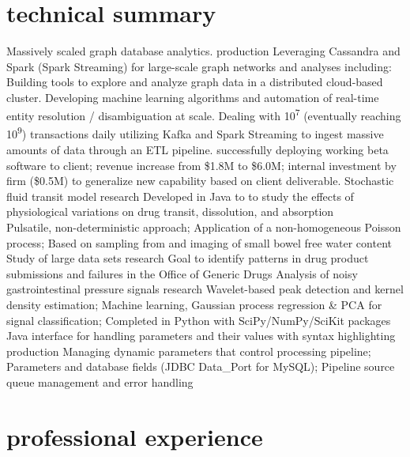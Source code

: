 \documentclass[10pt,twoside]{friggeri-cv}
\begin{document}
\section{technical summary}

\begin{entrylist}
  \entry
    {\scriptsize {}}
    {Massively scaled graph database analytics.}
    {production}
    {\scriptsize Leveraging Cassandra and Spark (Spark Streaming) for large-scale graph networks and analyses including:\\
    Building tools to explore and analyze graph data in a distributed cloud-based cluster.
    Developing machine learning algorithms and automation of real-time entity resolution / disambiguation at scale.
    Dealing with 10\textsuperscript{7} (eventually reaching 10\textsuperscript{9}) transactions daily utilizing Kafka and Spark Streaming to ingest massive amounts of data through an ETL pipeline.
    successfully deploying working beta software to client; revenue increase from \$1.8M to \$6.0M; internal investment by firm (\$0.5M) to generalize new capability based on client deliverable.}
  \entry
    {\scriptsize {}}
    {Stochastic fluid transit model}
    {research}
    {\scriptsize  Developed in Java to to study the effects of physiological variations on drug transit, dissolution, and absorption\\
    Pulsatile, non-deterministic approach; 
    Application of a non-homogeneous Poisson process; 
    Based on sampling from and imaging of small bowel free water content}
  \entry
    {\scriptsize {}}
    {Study of large data sets}
    {research}
    {\scriptsize Goal to identify patterns in drug product submissions and failures in the Office of Generic Drugs}
  \entry
    {\scriptsize {}}
    {Analysis of noisy gastrointestinal pressure signals}
    {research}
    {\scriptsize Wavelet-based peak detection and kernel density estimation;
    Machine learning, Gaussian process regression \& PCA for signal classification;
    Completed in Python with SciPy/NumPy/SciKit packages}
  \entry
    {\scriptsize {}}
    {Java interface for handling parameters and their values with syntax highlighting}
    {production}
    {\scriptsize Managing dynamic parameters that control processing pipeline;
    Parameters and database fields (JDBC Data\_Port for MySQL);
    Pipeline source queue management and error handling}
\end{entrylist}

\section{professional experience}
\end{document}
